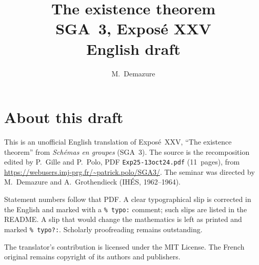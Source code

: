 \documentclass[11pt,a4paper,oneside]{amsbook}
\title[SGA~3, Expos\'e XXV (English draft)]{The existence theorem\\
{\normalsize SGA~3, Expos\'e XXV\\English draft}}
\author{M.\ Demazure}
\date{}
\begin{document}
\frontmatter
\maketitle

\chapter*{About this draft}
This is an unofficial English translation of Expos\'e~XXV, ``The existence theorem''
from \textit{Sch\'emas en groupes} (SGA~3).
The source is the recomposition edited by P.~Gille and P.~Polo,
PDF \texttt{Exp25-13oct24.pdf} (11~pages),
from \url{https://webusers.imj-prg.fr/~patrick.polo/SGA3/}.
The seminar was directed by M.~Demazure and A.~Grothendieck
(IH\'ES, 1962--1964).

Statement numbers follow that PDF. A clear typographical slip is
corrected in the English and marked with a \texttt{\% typo:} comment;
such slips are listed in the README. A slip that would change the
mathematics is left as printed and marked \texttt{\% typo?:}.
Scholarly proofreading remains outstanding.

The translator's contribution is licensed under the MIT License.
The French original remains copyright of its authors and publishers.

\tableofcontents
\mainmatter


\end{document}

